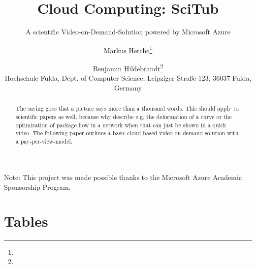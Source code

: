 \documentclass[english]{lni}
\begin{document}
\title{Cloud Computing: SciTub}
\subtitle{A scientific Video-on-Demand-Solution powered by Microsoft Azure}
\author[Markus Herche \and Benjamin Hildebrandt]
{Markus Herche\footnote{} \and
Benjamin Hildebrandt\footnote{}\\
Hochschule Fulda, Dept. of Computer Science, Leipziger Straße 123, 36037 Fulda,
Germany}



\maketitle

\begin{abstract}
    The saying goes that a picture says more than a thousand words. This should apply to scientific papers as well,
    because why describe e.g. the deformation of a curve or the optimization of package flow in a network when that can just be shown in a quick video. The following 
    paper outlines a basic cloud-based video-on-demand-solution with a pay-per-view-model. 
\end{abstract}

Note: This project was made possible thanks to the Microsoft Azure Academic Sponsorship Program.








\newpage
\appendix

\section*{Tables}

%
\newpage

\end{document}
